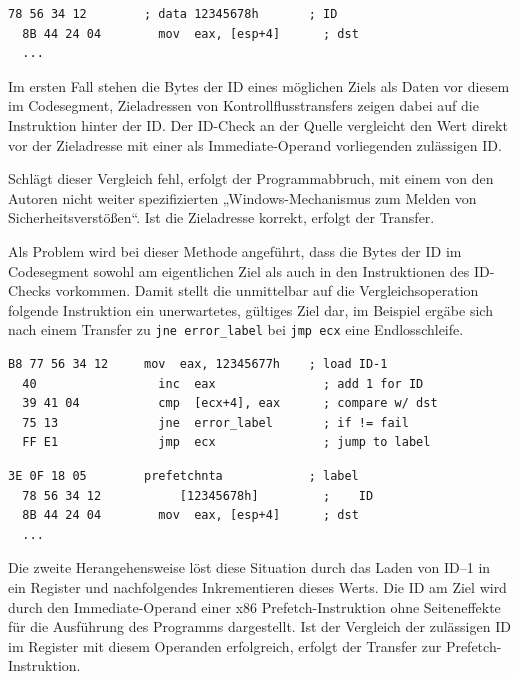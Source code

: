 \documentclass[11pt]{article}
\begin{document}
\begin{lstlisting}[title=Ziel]
  78 56 34 12        ; data 12345678h       ; ID
  8B 44 24 04        mov  eax, [esp+4]      ; dst
  ...
\end{lstlisting}

Im ersten Fall stehen die Bytes der ID eines möglichen Ziels als Daten vor
diesem im Codesegment, Zieladressen von Kontrollflusstransfers zeigen dabei auf
die Instruktion hinter der ID. Der ID-Check an der Quelle vergleicht den Wert
direkt vor der Zieladresse mit einer als Immediate-Operand vorliegenden
zulässigen ID.

Schlägt dieser Vergleich fehl, erfolgt der Programmabbruch, mit einem von den
Autoren nicht weiter spezifizierten „Windows-Mechanismus zum Melden von
Sicherheitsverstößen“. Ist die Zieladresse korrekt, erfolgt der Transfer.

\label{instrumentation-variant1}

Als Problem wird bei dieser Methode angeführt,
dass die Bytes der ID im Codesegment sowohl am eigentlichen Ziel als auch in
den Instruktionen des ID-Checks vorkommen. Damit stellt die unmittelbar auf die
Vergleichsoperation folgende Instruktion ein unerwartetes, gültiges Ziel dar,
im Beispiel ergäbe sich nach einem Transfer zu \texttt{jne error\_label} bei
\texttt{jmp ecx} eine Endlosschleife.

\begin{lstlisting}[title=Quelle]
  B8 77 56 34 12     mov  eax, 12345677h    ; load ID-1
  40                 inc  eax               ; add 1 for ID
  39 41 04           cmp  [ecx+4], eax      ; compare w/ dst
  75 13              jne  error_label       ; if != fail
  FF E1              jmp  ecx               ; jump to label
\end{lstlisting}

\begin{lstlisting}[title=Ziel]
  3E 0F 18 05        prefetchnta            ; label
  78 56 34 12           [12345678h]         ;    ID
  8B 44 24 04        mov  eax, [esp+4]      ; dst
  ...
\end{lstlisting}

\label{instrumentation-variant2}

Die zweite Herangehensweise löst diese Situation durch das Laden von ID–1 in
ein Register und nachfolgendes Inkrementieren dieses Werts. Die ID am Ziel wird
durch den Immediate-Operand einer x86 Prefetch-Instruktion ohne Seiteneffekte
für die Ausführung des Programms dargestellt. Ist der Vergleich der zulässigen
ID im Register mit diesem Operanden erfolgreich, erfolgt der Transfer zur
Prefetch-Instruktion.
\end{document}
